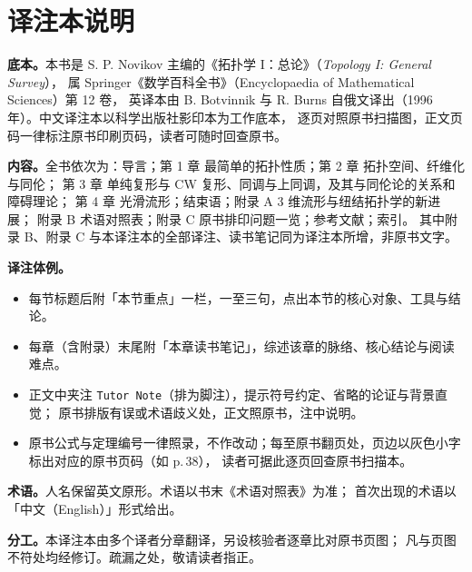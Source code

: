 \thispagestyle{empty}
\chapter*{译注本说明}

\textbf{底本。}本书是 S. P. Novikov 主编的《拓扑学 I：总论》（\emph{Topology I: General Survey}），
属 Springer《数学百科全书》（Encyclopaedia of Mathematical Sciences）第 12 卷，
英译本由 B. Botvinnik 与 R. Burns 自俄文译出（1996 年）。中文译注本以科学出版社影印本为工作底本，
逐页对照原书扫描图，正文页码一律标注原书印刷页码，读者可随时回查原书。

\textbf{内容。}全书依次为：导言；第 1 章 最简单的拓扑性质；第 2 章 拓扑空间、纤维化与同伦；
第 3 章 单纯复形与 CW 复形、同调与上同调，及其与同伦论的关系和障碍理论；
第 4 章 光滑流形；结束语；附录 A 3 维流形与纽结拓扑学的新进展；
附录 B 术语对照表；附录 C 原书排印问题一览；参考文献；索引。
其中附录 B、附录 C 与本译注本的全部译注、读书笔记同为译注本所增，非原书文字。

\textbf{译注体例。}
\begin{itemize}[leftmargin=2.2em,itemsep=2pt]
\item 每节标题后附「本节重点」一栏，一至三句，点出本节的核心对象、工具与结论。
\item 每章（含附录）末尾附「本章读书笔记」，综述该章的脉络、核心结论与阅读难点。
\item 正文中夹注 \texttt{Tutor Note}（排为脚注），提示符号约定、省略的论证与背景直觉；
      原书排版有误或术语歧义处，正文照原书，注中说明。
\item 原书公式与定理编号一律照录，不作改动；每至原书翻页处，页边以灰色小字标出对应的原书页码（如 p.\,38），
      读者可据此逐页回查原书扫描本。
\end{itemize}

\textbf{术语。}人名保留英文原形。术语以书末《术语对照表》为准；
首次出现的术语以「中文（English）」形式给出。

\textbf{分工。}本译注本由多个译者分章翻译，另设核验者逐章比对原书页图；
凡与页图不符处均经修订。疏漏之处，敬请读者指正。
\clearpage
